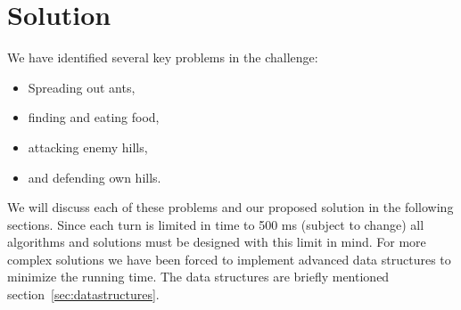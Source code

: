 \section{Solution}
We have identified several key problems in the challenge:
\begin{itemize}
\item Spreading out ants,
\item finding and eating food,
\item attacking enemy hills,
\item and defending own hills.
\end{itemize}
We will discuss each of these problems and our proposed solution in the following sections. Since each turn is limited in time to 500 ms (subject to change) all algorithms and solutions must be designed with this limit in mind. For more complex solutions we have been forced to implement advanced data structures to minimize the running time. The data structures are briefly mentioned section~\ref{sec:datastructures}.





